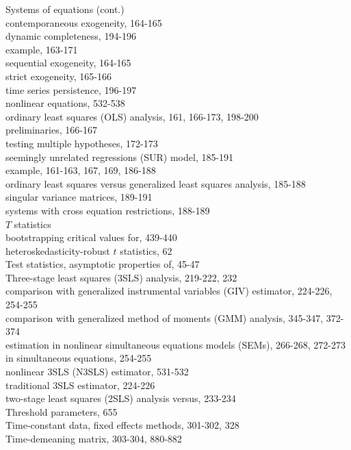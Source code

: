 \documentclass[10pt]{article}
\begin{document}
Systems of equations (cont.)\\
contemporaneous exogeneity, 164-165\\
dynamic completeness, 194-196\\
example, 163-171\\
sequential exogeneity, 164-165\\
strict exogeneity, 165-166\\
time series persistence, 196-197\\
nonlinear equations, 532-538\\
ordinary least squares (OLS) analysis, 161, 166-173, 198-200\\
preliminaries, 166-167\\
testing multiple hypotheses, 172-173\\
seemingly unrelated regressions (SUR) model, 185-191\\
example, 161-163, 167, 169, 186-188\\
ordinary least squares versus generalized least squares analysis, 185-188\\
singular variance matrices, 189-191\\
systems with cross equation restrictions, 188-189\\
$T$ statistics\\
bootstrapping critical values for, 439-440\\
heteroskedasticity-robust $t$ statistics, 62\\
Test statistics, asymptotic properties of, 45-47\\
Three-stage least squares (3SLS) analysis, 219-222, 232\\
comparison with generalized instrumental variables (GIV) estimator, 224-226, 254-255\\
comparison with generalized method of moments (GMM) analysis, 345-347, 372-374\\
estimation in nonlinear simultaneous equations models (SEMs), 266-268, 272-273\\
in simultaneous equations, 254-255\\
nonlinear 3SLS (N3SLS) estimator, 531-532\\
traditional 3SLS estimator, 224-226\\
two-stage least squares (2SLS) analysis versus, 233-234\\
Threshold parameters, 655\\
Time-constant data, fixed effects methods, 301-302, 328\\
Time-demeaning matrix, 303-304, 880-882\\
\end{document}
